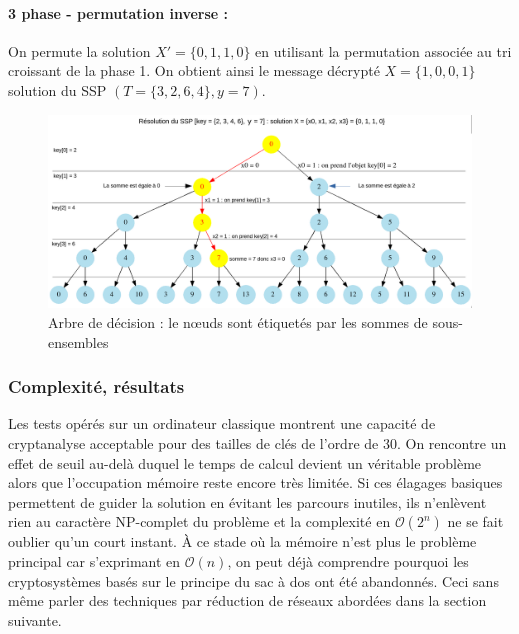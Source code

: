 \paragraph{3\ieme{} phase - permutation inverse :} On permute la solution $X' = \{0, 1, 1, 0\}$ en utilisant la permutation associée au tri croissant de la phase 1.
On obtient ainsi le message décrypté $X = \{1, 0, 0, 1\}$ solution du SSP $(T = \{3, 2, 6, 4\}, y = 7)$.

\begin{figure}[htp]
  \centering
  \includegraphics[width=16cm]{images/tree}
  \caption{Arbre de décision : le nœuds sont étiquetés par les sommes de sous-ensembles}
  \label{tree}
\end{figure}


\subsubsection{Complexité, résultats}

Les tests opérés sur un ordinateur classique montrent une capacité de cryptanalyse acceptable pour des tailles de clés
de l'ordre de 30. On rencontre un effet de seuil au-delà duquel le temps de calcul devient un véritable problème alors que l'occupation mémoire reste encore très limitée. Si ces élagages basiques permettent de guider la solution en évitant les parcours inutiles, ils n'enlèvent rien au caractère NP-complet du problème et la complexité en $\mathcal{O}(2^n)$ ne se fait oublier qu'un court instant. À ce stade où la mémoire n'est plus le problème principal car s'exprimant en $\mathcal{O}(n)$, on peut déjà
comprendre pourquoi les cryptosystèmes basés sur le principe du sac à dos ont été abandonnés. Ceci sans même parler des techniques 
par réduction de réseaux abordées dans la section suivante.